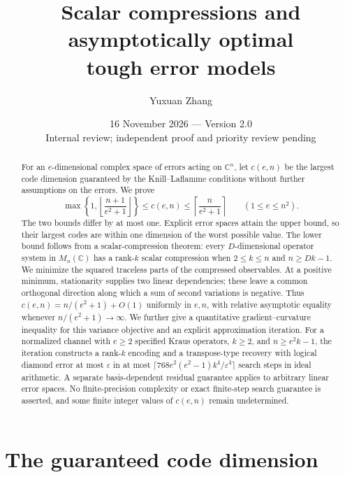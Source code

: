 \documentclass[11pt]{article}
\title{Scalar compressions and asymptotically optimal\protect\\ tough error models}
\author{Yuxuan Zhang}
\date{16 November 2026 --- Version 2.0\\[4pt]
  \small Internal review; independent proof and priority review pending}
\newcommand{\C}{\mathbb C}
\theoremstyle{remark}
\numberwithin{equation}{section}
\begin{document}
\maketitle
\begin{abstract}
For an $e$-dimensional complex space of errors acting on $\C^n$, let
$c(e,n)$ be the largest code dimension guaranteed by the Knill--Laflamme
conditions without further assumptions on the errors. We prove
\[
 \max\!\left\{1,\left\lfloor\frac{n+1}{e^2+1}\right\rfloor\right\}
 \le c(e,n)\le
 \left\lceil\frac{n}{e^2+1}\right\rceil
 \qquad (1\le e\le n^2).
\]
The two bounds differ by at most one. Explicit error spaces attain the
upper bound, so their largest codes are within one dimension of the
worst possible value. The lower bound follows from a scalar-compression
theorem: every $D$-dimensional operator system in $M_n(\C)$ has a rank-$k$
scalar compression when $2\le k\le n$ and $n\ge Dk-1$.
We minimize the squared traceless parts of the compressed observables.
At a positive minimum, stationarity supplies two linear dependencies;
these leave a common orthogonal direction along which a sum of second
variations is negative. Thus $c(e,n)=n/(e^2+1)+O(1)$ uniformly in $e,n$,
with relative asymptotic equality whenever $n/(e^2+1)\to\infty$.
We further give a quantitative gradient--curvature inequality for this
variance objective and an explicit approximation iteration. For a normalized
channel with $e\ge2$ specified Kraus operators, $k\ge2$, and
$n\ge e^2k-1$, the iteration constructs a rank-$k$ encoding and a
transpose-type recovery with logical diamond error at most $\varepsilon$
in at most $\lceil768e^2(e^2-1)k^4/\varepsilon^4\rceil$ search steps
in ideal arithmetic. A separate basis-dependent residual guarantee applies
to arbitrary linear error spaces. No finite-precision complexity or exact
finite-step search guarantee is asserted, and some finite integer values
of $c(e,n)$ remain undetermined.
\end{abstract}

\section{The guaranteed code dimension}
\end{document}
